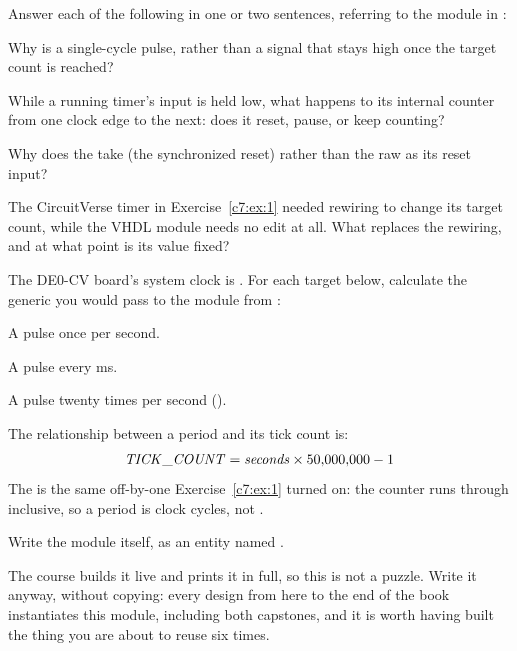 \label{c7:ex:2}
Answer each of the following in one or two sentences, referring to the  module in
:

\begin{parts}
  \item Why is  a single-cycle pulse, rather than a signal that stays high once the
    target count is reached?
  \item While a running timer's  input is held low, what happens to its internal
    counter from one clock edge to the next: does it reset, pause, or keep counting?
  \item Why does the  take  (the synchronized reset) rather than the
    raw  as its reset input?
  \item The CircuitVerse timer in Exercise~\ref{c7:ex:1} needed rewiring to change its target
    count, while the VHDL module needs no edit at all. What replaces the rewiring, and at what point
    is its value fixed?
\end{parts}

\label{c7:set:2}

\label{c7:ex:3}
The DE0-CV board's system clock is . For each target below, calculate the
 generic you would pass to the  module from :

\begin{parts}
  \item A  pulse once per second.
  \item A  pulse every  ms.
  \item A  pulse twenty times per second ().
\end{parts}
\note[Tip] The relationship between a period and its tick count is:
\[
  \mathit{TICK\_COUNT} = \mathit{seconds} \times 50{,}000{,}000 - 1
\]
The  is the same off-by-one Exercise~\ref{c7:ex:1} turned on: the counter runs 
through  inclusive, so a period is  clock cycles, not
.

\label{c7:ex:4}
Write the  module itself, as an entity named .

The course builds it live and  prints it in full, so this is not a puzzle. Write it
anyway, without copying: every design from here to the end of the book instantiates this module,
including both capstones, and it is worth having built the thing you are about to reuse six times.

